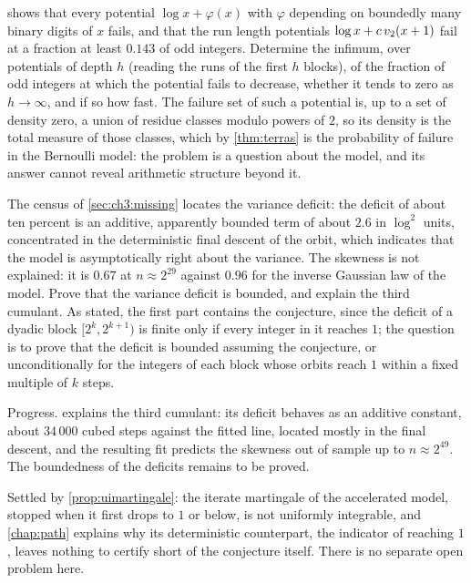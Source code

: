 \begin{problem*}\label{prob:ch11:o3p}
 shows that every potential $\log x+\varphi(x)$ with
$\varphi$ depending on boundedly many binary digits of $x$ fails, and that the
run length potentials $\log x+c\,v_2(x+1)$ fail at a fraction at least $0.143$
of odd integers. Determine the infimum, over potentials of depth $h$ (reading the runs of the first $h$ blocks), of the fraction of odd integers at which the potential fails to decrease, whether it tends to zero as $h\to\infty$, and if so how fast.
The failure set of such a potential is, up to a set of density zero, a union of residue classes modulo powers of $2$, so its density is the total measure of those classes, which by \cref{thm:terras} is the probability of failure in the Bernoulli model: the problem is a question about the model, and its answer cannot reveal arithmetic structure beyond it.
\end{problem*}

\begin{problem*}\label{prob:ch11:o4}
The census of \cref{sec:ch3:missing} locates the variance deficit: the deficit of about
ten percent is an additive, apparently bounded term of about $2.6$ in $\log^2$
units, concentrated in the deterministic final descent of the orbit, which
indicates that the model is asymptotically right about the variance. The skewness is not explained:
it is $0.67$ at $n\approx2^{29}$ against $0.96$ for the inverse Gaussian law of
the model. Prove that the variance deficit is bounded, and explain the third
cumulant.
As stated, the first part contains the conjecture, since the deficit of a dyadic block $[2^k,2^{k+1})$ is finite only if every integer in it reaches $1$; the question is to prove that the deficit is bounded assuming the conjecture, or unconditionally for the integers of each block whose orbits reach $1$ within a fixed multiple of $k$ steps.
\end{problem*}

Progress.  explains the third cumulant: its deficit behaves as an
additive constant, about $34\,000$ cubed steps against the fitted line, located mostly in the final descent,
and the resulting fit predicts the skewness out of sample up to $n\approx2^{49}$.
The boundedness of the deficits remains to be proved.

\begin{problem*}\label{prob:ch11:o5}
Settled by \cref{prop:uimartingale}: the iterate martingale of the accelerated model,
stopped when it first drops to $1$ or below, is not uniformly integrable, and \cref{chap:path} explains why its deterministic counterpart, the indicator of reaching $1$, leaves nothing to certify short of the conjecture itself. There is no separate open problem here.
\end{problem*}

